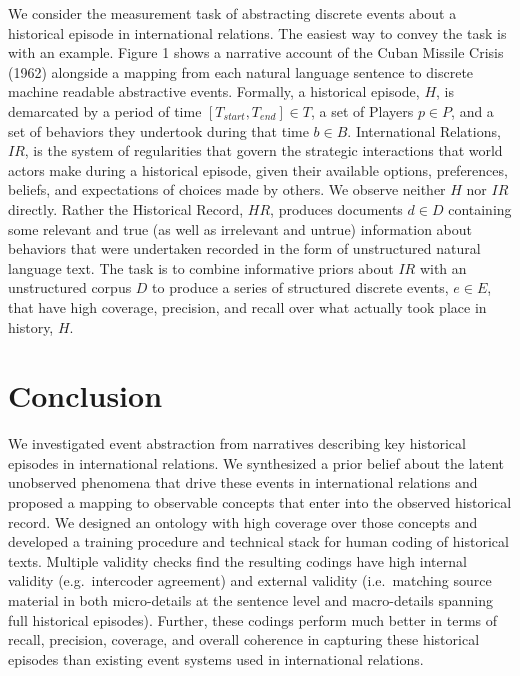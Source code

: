 \documentclass{article}
\begin{document}
We consider the measurement task of abstracting discrete events about a
historical episode in international relations. The easiest way to convey
the task is with an example. Figure 1 shows a narrative account of the
Cuban Missile Crisis (1962) alongside a mapping from each natural
language sentence to discrete machine readable abstractive events.
Formally, a historical episode, \(H\), is demarcated by a period of time
\([T_{start}, T_{end}] \in T\), a set of Players \(p \in P\), and a set
of behaviors they undertook during that time \(b \in B\). International
Relations, \(IR\), is the system of regularities that govern the
strategic interactions that world actors make during a historical
episode, given their available options, preferences, beliefs, and
expectations of choices made by others. We observe neither \(H\) nor
\(IR\) directly. Rather the Historical Record, \(HR\), produces
documents \(d \in D\) containing some relevant and true (as well as
irrelevant and untrue) information about behaviors that were undertaken
recorded in the form of unstructured natural language text. The task is
to combine informative priors about \(IR\) with an unstructured corpus
\(D\) to produce a series of structured discrete events, \(e \in E\),
that have high coverage, precision, and recall over what actually took
place in history, \(H\).

\hypertarget{format}{%
\section*{Conclusion}\label{format}}

We investigated event abstraction from narratives describing key
historical episodes in international relations. We synthesized a prior
belief about the latent unobserved phenomena that drive these events in
international relations and proposed a mapping to observable concepts
that enter into the observed historical record. We designed an ontology
with high coverage over those concepts and developed a training
procedure and technical stack for human coding of historical texts.
Multiple validity checks find the resulting codings have high internal
validity (e.g.~intercoder agreement) and external validity
(i.e.~matching source material in both micro-details at the sentence
level and macro-details spanning full historical episodes). Further,
these codings perform much better in terms of recall, precision,
coverage, and overall coherence in capturing these historical episodes
than existing event systems used in international relations.
\end{document}
